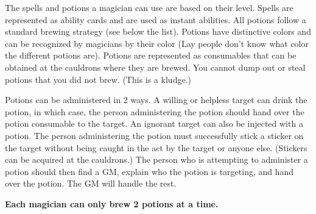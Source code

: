 \documentclass[green]{NeptuneBall}
\begin{document}
\name{\gPotions{}}

The spells and potions a magician can use are based on their level. Spells are represented as ability cards and are used as instant abilities. All potions follow a standard brewing strategy (see below the list). Potions have distinctive colors and can be recognized by magicians by their color (Lay people don't know what color the different potions are). Potions are represented as consumables that can be obtained at the cauldrons where they are brewed. You cannot dump out or steal potions that you did not brew. (This is a kludge.)

Potions can be administered in 2 ways. A willing or helpless target can drink the potion, in which case, the person administering the potion should hand over the potion consumable to the target. An ignorant target can also be injected with a potion. The person administering the potion must successfully stick a sticker on the target without being caught in the act by the target or anyone else. (Stickers can be acquired at the cauldrons.) The person who is attempting to administer a potion should then find a GM, explain who the potion is targeting, and hand over the potion. The GM will handle the rest.

{\bf Each magician can only brew 2 potions at a time.} %
\end{document}
